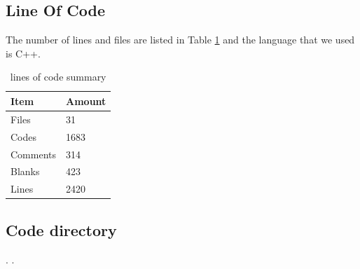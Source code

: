 \subsection{Line Of Code}

The number of lines and files are listed in Table \ref{tab:lines_of_code} and the language that we used is C++.




\begin{table}
\centering
\caption{lines of code summary}
\begin{tabular}{|l|l|} 
\hline
Item        & Amount  \\ 
\hline
Files       & 31             \\ 
\hline
Codes       & 1683           \\ 
\hline
Comments    & 314            \\
\hline
Blanks       & 423             \\
\hline
Lines       & 2420             \\
\hline
\end{tabular}
\label{tab:lines_of_code}
\end{table}





\subsection{Code directory}
.
.


